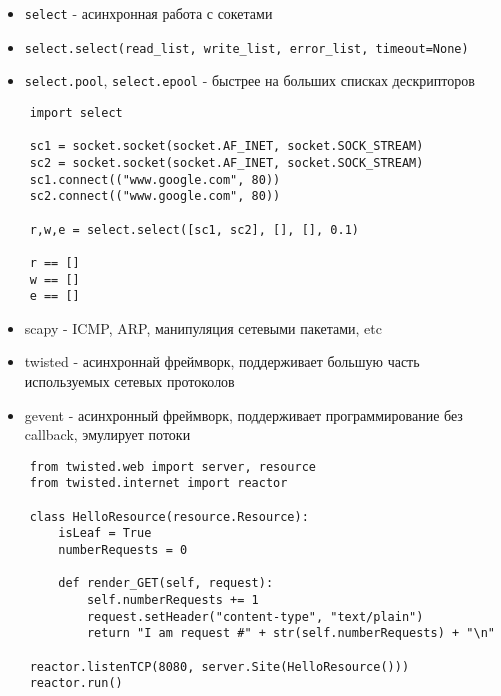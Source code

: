 \documentclass{article}
\begin{document}
\begin{itemize}
\item \lstinline!select! - асинхронная работа с сокетами
\item \lstinline!select.select(read_list, write_list, error_list, timeout=None)!
\item \lstinline!select.pool!, \lstinline!select.epool! - быстрее на больших списках дескрипторов
\end{itemize}

{
\vspace{15pt}
\begin{lstlisting}
	import select
	
	sc1 = socket.socket(socket.AF_INET, socket.SOCK_STREAM)
	sc2 = socket.socket(socket.AF_INET, socket.SOCK_STREAM)	
	sc1.connect(("www.google.com", 80))
	sc2.connect(("www.google.com", 80))

	r,w,e = select.select([sc1, sc2], [], [], 0.1)

	r == []
	w == []
	e == []
\end{lstlisting}
}

\newpage

\begin{itemize}

\item scapy - ICMP, ARP, манипуляция сетевыми пакетами, etc
\item twisted - асинхроннай фреймворк, поддерживает большую 
		часть используемых сетевых протоколов
\item gevent - асинхронный фреймворк, поддерживает программирование без callback,
				эмулирует потоки


\end{itemize}
\newpage

{
\vspace{15pt}
\begin{lstlisting}
	from twisted.web import server, resource
	from twisted.internet import reactor

	class HelloResource(resource.Resource):
	    isLeaf = True
	    numberRequests = 0
	    
	    def render_GET(self, request):
	        self.numberRequests += 1
	        request.setHeader("content-type", "text/plain")
	        return "I am request #" + str(self.numberRequests) + "\n"

	reactor.listenTCP(8080, server.Site(HelloResource()))
	reactor.run()
\end{lstlisting}
}
\end{document}
